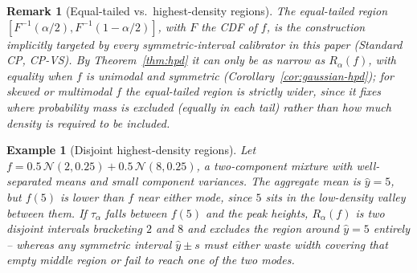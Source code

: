 \documentclass[10pt,twocolumn,a4paper]{article}
\newtheorem{remark}{Remark}
\newtheorem{example}{Example}
\begin{document}
\begin{remark}[Equal-tailed vs.\ highest-density regions]
The equal-tailed region $[F^{-1}(\alpha/2), F^{-1}(1-\alpha/2)]$, with $F$ the CDF of $f$, is the
construction implicitly targeted by every symmetric-interval calibrator in this paper (Standard CP,
CP-VS). By Theorem~\ref{thm:hpd} it can only be as narrow as $R_\alpha(f)$, with equality when $f$ is
unimodal and symmetric (Corollary~\ref{cor:gaussian-hpd}); for skewed or multimodal $f$ the
equal-tailed region is strictly wider, since it fixes \emph{where} probability mass is excluded
(equally in each tail) rather than \emph{how much} density is required to be included.
\end{remark}

\begin{example}[Disjoint highest-density regions]
\label{ex:bimodal}
Let $f = 0.5\,\mathcal N(2,0.25) + 0.5\,\mathcal N(8,0.25)$, a two-component mixture with
well-separated means and small component variances. The aggregate mean is $\hat y = 5$, but
$f(5)$ is lower than $f$ near either mode, since $5$ sits in the low-density valley between them. If
$\tau_\alpha$ falls between $f(5)$ and the peak heights, $R_\alpha(f)$ is two disjoint intervals
bracketing $2$ and $8$ and \emph{excludes} the region around $\hat y=5$ entirely -- whereas any
symmetric interval $\hat y\pm s$ must either waste width covering that empty middle region or fail
to reach one of the two modes.
\end{example}
\end{document}
